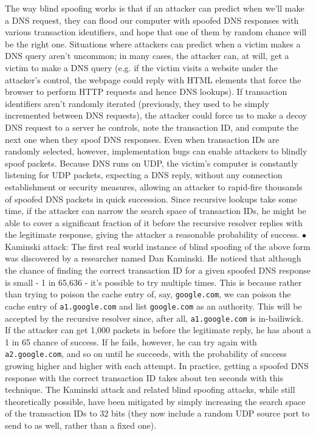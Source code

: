 \documentclass{article}
\begin{document}
\newline
\indent The way blind spoofing works is that if an attacker can predict when we'll make a DNS request, they can flood our computer with spoofed DNS responses with various transaction identifiers, and hope that one of them by random chance will be the right one. Situations where attackers can predict when a victim makes a DNS query aren't uncommon; in many cases, the attacker can, at will, get a victim to make a DNS query (e.g. if the victim visits a website under the attacker's control, the webpage could reply with HTML elements that force the browser to perform HTTP requests and hence DNS lookups). If transaction identifiers aren't randomly iterated (previously, they used to be simply incremented between DNS requests), the attacker could force us to make a decoy DNS request to a server he controls, note the transaction ID, and compute the next one when they spoof DNS responses. Even when transaction IDs are randomly selected, however, implementation bugs can enable attackers to blindly spoof packets. Because DNS runs on UDP, the victim's computer is constantly listening for UDP packets, expecting a DNS reply, without any connection establishment or security measures, allowing an attacker to rapid-fire thousands of spoofed DNS packets in quick succession. Since recursive lookups take some time, if the attacker can narrow the search space of transaction IDs, he might be able to cover a significant fraction of it before the recursive resolver replies with the legitimate response, giving the attacker a reasonable probability of success.
\newline
\indent \indent $ \bullet $ Kaminski attack: The first real world instance of blind spoofing of the above form was discovered by a researcher named Dan Kaminski. He noticed that although the chance of finding the correct transaction ID for a given spoofed DNS response is small - 1 in 65,636 - it's possible to try multiple times. This is because rather than trying to poison the cache entry of, say, \texttt{google.com}, we can poison the cache entry of \texttt{a1.google.com} and list \texttt{google.com} as an authority. This will be accepted by the recursive resolver since, after all, \texttt{a1.google.com} is in-bailiwick. If the attacker can get 1,000 packets in before the legitimate reply, he has about a 1 in 65 chance of success. If he fails, however, he can try again with \texttt{a2.google.com}, and so on until he succeeds, with the probability of success growing higher and higher with each attempt. In practice, getting a spoofed DNS response with the correct transaction ID takes about ten seconds with this technique.
\newline \newline
The Kaminski attack and related blind spoofing attacks, while still theoretically possible, have been mitigated by simply increasing the search space of the transaction IDs to 32 bits (they now include a random UDP source port to send to as well, rather than a fixed one).
\end{document}

